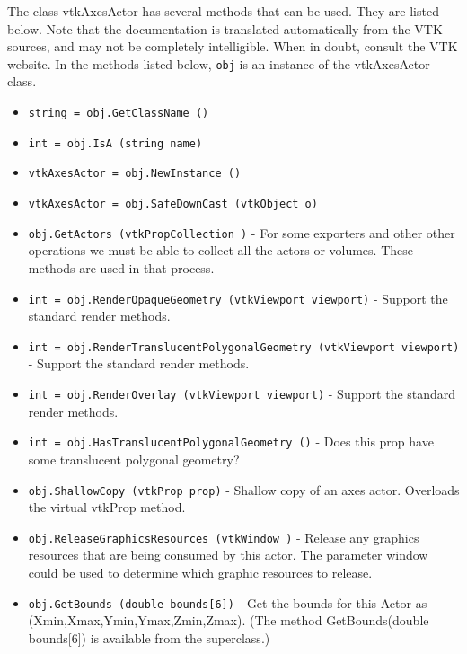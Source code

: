 The class vtkAxesActor has several methods that can be used.
  They are listed below.
Note that the documentation is translated automatically from the VTK sources,
and may not be completely intelligible.  When in doubt, consult the VTK website.
In the methods listed below, \verb|obj| is an instance of the vtkAxesActor class.
\begin{itemize}
\item  \verb|string = obj.GetClassName ()|

\item  \verb|int = obj.IsA (string name)|

\item  \verb|vtkAxesActor = obj.NewInstance ()|

\item  \verb|vtkAxesActor = obj.SafeDownCast (vtkObject o)|

\item  \verb|obj.GetActors (vtkPropCollection )| -  For some exporters and other other operations we must be
 able to collect all the actors or volumes. These methods
 are used in that process.

\item  \verb|int = obj.RenderOpaqueGeometry (vtkViewport viewport)| -  Support the standard render methods.

\item  \verb|int = obj.RenderTranslucentPolygonalGeometry (vtkViewport viewport)| -  Support the standard render methods.

\item  \verb|int = obj.RenderOverlay (vtkViewport viewport)| -  Support the standard render methods.

\item  \verb|int = obj.HasTranslucentPolygonalGeometry ()| -  Does this prop have some translucent polygonal geometry?

\item  \verb|obj.ShallowCopy (vtkProp prop)| -  Shallow copy of an axes actor. Overloads the virtual vtkProp method.

\item  \verb|obj.ReleaseGraphicsResources (vtkWindow )| -  Release any graphics resources that are being consumed by this actor.
 The parameter window could be used to determine which graphic
 resources to release.

\item  \verb|obj.GetBounds (double bounds[6])| -  Get the bounds for this Actor as (Xmin,Xmax,Ymin,Ymax,Zmin,Zmax). (The
 method GetBounds(double bounds[6]) is available from the superclass.)


\end{itemize}
